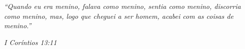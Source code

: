 \newpage

\vspace*{10cm}
\hspace{4cm}\begin{minipage}{.51\textwidth}

\textit{``Quando eu era menino, falava como menino, sentia como menino, discorria como menino, mas, logo que cheguei a ser homem, acabei com as coisas de menino.'' }

\begin{flushright}\itshape I Coríntios 13:11 \upshape\end{flushright}

\end{minipage}